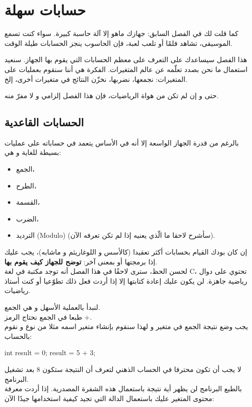 \chapter{حسابات سهلة}

كما قلت لك في الفصل السابق: جهازك ماهو إلا آلة حاسبة كبيرة. سواء كنت تسمع الموسيقى، تشاهد فلمًا أو تلعب لعبة، فإن الحاسوب ينجز الحسابات طيلة الوقت.

هذا الفصل سيساعدك على التعرف على معظم الحسابات التي يقوم بها الجهاز. سنعيد استعمال ما نحن بصدد تعلّمه عن عالم المتغيرات. الفكرة هي أننا سنقوم بعمليات على المتغيرات: نجمعها، نضربها، نخزّن النتائج في متغيرات أخرى، إلخ.

حتى و إن لم تكن من هواة الرياضيات، فإن هذا الفصل إلزامي و لا مفرّ منه.

\section{الحسابات القاعدية}

بالرغم من قدرة الجهاز الواسعة إلا أنه في الأساس يتعمد في حساباته على عمليات بسيطة للغاية و هي:

\begin{itemize}
  \item الجمع،
  \item الطرح،
  \item القسمة،
  \item الضرب،
  \item الترديد
(\textenglish{Modulo})
(سأشرح لاحقا ما الّذي يعنيه إذا لم تكن تعرفه الآن).
\end{itemize}

إن كان بودك القيام بحسابات أكثر تعقيدا (كالأسس و اللوغاريثم و ماشابه)، يجب عليك إذا برمجتها أو بمعنى آخر:
\textbf{توضح للجهاز كيف يقوم بها}.\\
لحسن الحظ، سترى لاحقًا في هذا الفصل أنه توجد مكتبة في لغة \textenglish{C}،
تحتوي على دوال رياضية جاهزة. لن يكون عليك إعادة كتابتها إلا إذا أردت فعل ذلك تطوّعيا أو كنت أستاذ رياضيات.

لنبدأ بالعملية الأسهل و هي الجمع.\\
طبعا في الجمع نحتاج الرمز +.\\
يجب وضع نتيجة الجمع في متغير و لهذا سنقوم بإنشاء متغير اسمه مثلا
من نوع
و نقوم بالحساب:

\begin{Csource}
  int result = 0;
  result = 5 + 3;
\end{Csource}

لا يجب أن تكون محترفا في الحساب الذهني لتعرف أن النتيجة ستكون 8 بعد تشغيل البرنامج.\\
بالطبع البرنامج لن يظهر أية نتيجة باستعمال هذه الشفرة المصدرية. إذا أردت معرفة محتوى المتغير
عليك باستعمال الدالة
التي تجيد كيفية استخدامها جيدًا الآن:

